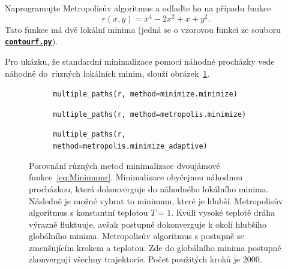 \documentclass[a4paper,11pt,twoside]{article}
\def\code#1{\textnormal{\texttt{#1}}}
\def\ghfile#1#2{\textnormal{\textbf{\texttt{\href{https://github.com/PavelStransky/PCInPhysics/blob/main/#1#2}{#2}}}}}
\theoremstyle{red}
\theoremstyle{green}
\begin{document}
\begin{solved}
    Naprogramujte Metropolisův algoritmus a odlaďte ho na případu funkce
    \begin{equation}\label{eq:Minimumr}
        r(x,y)=x^{4}-2x^{2}+x+y^{2}.
    \end{equation}
    Tato funkce má dvě lokální minima (jedná se o vzorovou funkci ze souboru \ghfile{python/basics/}{contourf.py}).
\end{solved}

\begin{solution}
    Pro ukázku, že standardní minimalizace pomocí náhodné procházky vede náhodně do~různých lokálních minim, slouží obrázek~\ref{fig:MetropolisMinimalizacea}.

    \begin{figure}[!htb]
        \centering
        \begin{subfigure}{0.49\linewidth}
            \centering{}
            \caption{\centering\code{multiple_paths(r, method=minimize.minimize)}}
            \label{fig:MetropolisMinimalizacea}
        \end{subfigure}
        \hfill
        \begin{subfigure}{0.49\linewidth}
            \centering{}
            \caption{\centering\code{multiple_paths(r, method=metropolis.minimize)}}
            \label{fig:MetropolisMinimalizaceb}
        \end{subfigure}
        \hfill
        \begin{subfigure}{0.5\linewidth}
            \centering{}
            \caption{\centering\code{multiple_paths(r, method=metropolis.minimize_adaptive)}}
            \label{fig:MetropolisMinimalizacec}
        \end{subfigure}
        \hfill

        \caption{
            \protect\small
            Porovnání různých metod minimalizace dvoujámové funkce~\eqref{eq:Minimumr}.
             Minimalizace obyčejnou náhodnou procházkou, která dokonverguje do náhodného lokálního minima.
            Následně je možné vybrat to minimum, které je hlubší.
             Metropolisův algoritmus s konstantní teplotou $T=1$.
            Kvůli vysoké teplotě dráha výrazně fluktuuje, avšak postupně dokonverguje k okolí hlubšího globálního minima.
             Metropolisův algoritmus s postupně se zmenšujícím krokem a teplotou.
            Zde do globálního minima postupně zkonvergují všechny trajektorie.
            Počet použitých kroků je $2000$.
        }	
        \label{fig:MetropolisMinimalizace}
    \end{figure}
    

\end{solution}
\end{document}
